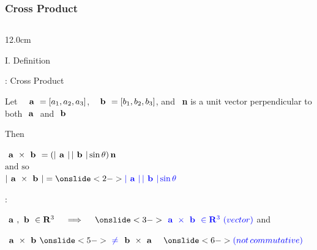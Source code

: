 \begin{frame}
\frametitle{Cross Product}
\begin{columns}
\begin{column}{12.0cm}

{I. Definition}

\vspace{0.2cm}

\scriptsize
	
: Cross Product

\vspace{0.3cm}

Let \,\, $\textbf{ a } = [a_1,a_2,a_3]$, \, $\textbf{ b } = [b_1,b_2,b_3]$, and \, {\bf n} is a unit vector perpendicular to both $\textbf{ a }$ and $\textbf{ b }$

\vspace{0.3cm}

Then 
\begin{center}
	$\textbf{ a } \times \textbf{ b } = (|\textbf{ a }|\,|\textbf{ b }|\sin \theta) \, {\bf n}$ \\
	\vspace{0.2cm}
	$\text{and so}$\\
	\vspace{0.2cm}
	$|\VA \times \VB| = \ON<2->{\B{|\VA|\,|\VB|\sin \theta}}$
\end{center}

\vspace{0.2cm}

:

\vspace{0.1cm}

\OBUL $\VA,\VB \in \RE^3 \quad \implies \quad 
\ON<3->{\B{\VA \times \VB \in \RE^3 \,\, (vector)}}$ and \,\,
\\

\vspace{0.2cm}

\OBUL $\VA \times \VB 
\ON<5->{\B{\,\,\ne\,\,}} \VB \times \VA \quad 
\ON<6->{\B{(not \, commutative)}}$ 

\vspace{0.2cm}


\end{column}
\end{columns}
\end{frame}
